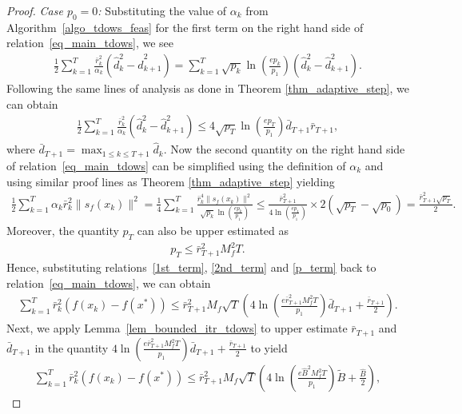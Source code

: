\documentclass{article}
\theoremstyle{plain}
\theoremstyle{definition}
\theoremstyle{remark}
\begin{document}
\begin{proof}
\noindent\textit{Case $p_0 = 0$:} Substituting the value of $\alpha_k$ from Algorithm~\ref{algo_tdows_feas} for the first term on the right hand side of relation~\eqref{eq_main_tdows}, we see
\begin{align*}
    \frac{1}{2} \sum_{k=1}^{T} \frac{\bar{r}_k^2}{\alpha_k} \left(\hat d_k^2 - \hat d_{k+1}^2 \right) = \sum_{k=1}^{T} \sqrt{p_k}  \ln \left( \frac{e p_k}{p_1} \right) \left(\hat d_k^2 - \hat d_{k+1}^2 \right) .
\end{align*}
Following the same lines of analysis as done in Theorem \ref{thm_adaptive_step}, we can obtain
\begin{align}
    \frac{1}{2} \sum_{k=1}^{T} \frac{\bar{r}_k^2}{\alpha_k} \left(\hat d_k^2 - \hat d_{k+1}^2 \right) \leq 4 \sqrt{p_T}  \ln \left( \frac{e p_T}{p_1} \right) \bar d_{T+1} \bar r_{T+1} , \label{1st_term}
\end{align}
where $\bar d_{T+1} = \max_{1 \leq k \leq T+1} \hat d_k$. Now the second quantity on the right hand side of relation~\eqref{eq_main_tdows} can be simplified using the definition of $\alpha_k$ and using similar proof lines as Theorem \ref{thm_adaptive_step} yielding
\begin{align}
    \frac{1}{2} \sum_{k=1}^{T} \alpha_k \bar{r}_k^2 \| s_f(x_k) \|^2 = \frac{1}{4} \sum_{k=1}^{T} \frac{\bar{r}_k^4 \| s_f(x_k) \|^2}{\sqrt{p_k} \ln \left( \frac{e p_k}{p_1} \right)} \leq \frac{\bar{r}_{T+1}^2}{4 \ln \left( \frac{e p_1}{p_1} \right)} \times 2 (\sqrt{p_T} - \sqrt{p_0}) = \frac{\bar{r}_{T+1}^2 \sqrt{p_T}}{2} . \label{2nd_term}
\end{align}
Moreover, the quantity $p_T$ can also be upper estimated as 
\begin{align}
    p_{T} \leq \bar{r}_{T+1}^2 M_f^2 T . \label{p_term}
\end{align}
Hence, substituting relations~\eqref{1st_term}, \eqref{2nd_term} and \eqref{p_term} back to relation~\eqref{eq_main_tdows}, we can obtain
\begin{align*}
    \sum_{k=1}^{T} \bar{r}_k^2 \left( f(x_k) - f(x^*) \right) \leq \bar r_{T+1}^2 M_f \sqrt{T} \left( 4 \ln \left( \frac{e \bar r_{T+1}^2 M_f^2 T}{p_1} \right) \bar d_{T+1} + \frac{\bar r_{T+1}}{2} \right) .
\end{align*}
Next, we apply Lemma~\ref{lem_bounded_itr_tdows} to upper estimate $\bar r_{T+1}$ and $\bar d_{T+1}$ in the quantity $4 \ln \left( \frac{e \bar r_{T+1}^2 M_f^2 T}{p_1} \right) \bar d_{T+1} + \frac{\bar r_{T+1}}{2}$ to yield
\begin{align}
    \sum_{k=1}^{T} \bar{r}_k^2 \left( f(x_k) - f(x^*) \right) \leq \bar r_{T+1}^2 M_f \sqrt{T} \left( 4 \ln \left( \frac{e \widehat B^2 M_f^2 T}{p_1} \right) \widetilde B + \frac{\widehat B}{2} \right) , \label{tdows_eqn1}

\end{align}
\end{proof}
\end{document}
